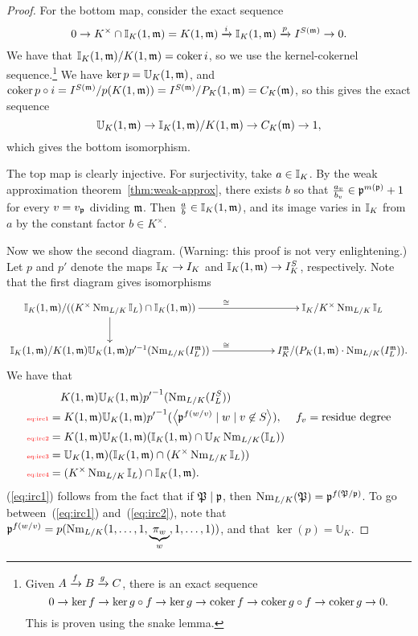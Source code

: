 \begin{proof}
For the bottom map, consider the exact sequence
\[
0\to K^{\times}\cap \mathbb{I}_K(1,{\mathfrak{m}})=K(1,\mathfrak{m})\xrightarrow{i} \mathbb{I}_K(1,{\mathfrak{m}})\xrightarrow{p} I^{S(\mathfrak{m})}\to 0.
\]
We have that $\mathbb{I}_K(1,{\mathfrak{m}})/K(1,\mathfrak{m})=\operatorname{coker} i$, so we use the kernel-cokernel sequence.\footnote{Given $A\xrightarrow{f}B\xrightarrow{g}C$, there is an exact sequence
\[
0\to \ker f\to \ker g\circ f\to \ker g\to \operatorname{coker} f\to \operatorname{coker} g\circ f\to \operatorname{coker} g\to 0.
\]
This is proven using the snake lemma.
}
We have $\ker p=\mathbb U_K(1,\mathfrak{m})$, and $\operatorname{coker} p\circ i=I^{S(\mathfrak{m})}/p(K(1,\mathfrak{m}))=I^{S(\mathfrak{m})}/P_K(1,{\mathfrak{m}})=C_K(\mathfrak{m})$, so this gives the exact sequence  
\[
\mathbb U_K(1,\mathfrak{m})\to  \mathbb{I}_K(1,{\mathfrak{m}})/K(1,{\mathfrak{m}})\to C_K(\mathfrak{m})\to 1,
\]
which gives the bottom isomorphism.

The top map is clearly injective. For surjectivity, take $a\in \mathbb{I}_K$. By the weak approximation theorem~\ref{thm:weak-approx}, there exists $b$ so that $\frac{a_v}{b_v}\in \mathfrak{p}^{m(\mathfrak{p})}+1$ for every $v=v_{\mathfrak{p}}$ dividing $\mathfrak{m}$. Then $\frac{a}{b}\in \mathbb{I}_K(1,{\mathfrak{m}})$, and its image varies in $\mathbb{I}_K$ from $a$ by the constant factor $b\in K^{\times}$.

Now we show the second diagram. (Warning: this proof is not very enlightening.) Let $p$ and $p'$ denote the maps $\mathbb{I}_K\to I_K$ and $\mathbb{I}_K(1,\mathfrak{m})\to I_K^S$, respectively. Note that the first diagram gives isomorphisms
\[
\xymatrixcolsep{5pc}
\xymatrix{
\I_K(1,{\mm})/((K^{\times}\nm_{L/K}\I_L)\cap \I_K(1,\mm)) \ar[r]^{\cong} \ar[d]& \I_K/K^{\times}\nm_{L/K}\I_L\\
\I_K(1,{\mm})/
K(1,\mm)\mathbb U_K(1,\mm)
p'^{-1}(\nm_{L/K}(I_L^{\mm}))\ar[r]^{\cong} & I_K^{\mm}/(P_{K}(1,\mm)\cdot \nm_{L/K}(I_L^{\mm})).
}
\]
We have that
\begin{align}
\noindent
&\quad
K(1,{\mm})\mathbb U_K(1,{\mm}){p'}^{-1}(\nm_{L/K}(I_L^{S}))\\
\llabel{eq:irc1}&=
K(1,{\mm})\mathbb U_K(1,{\mm}){p'}^{-1}(\an{\mfp^{f(w/v)}\mid w\mid v\nin S}),&f_v=\text{residue degree}\\
\llabel{eq:irc2}
&=
K(1,{\mm}) \mathbb U_K(1,{\mm})(\I_K(1,{\mm})\cap \mathbb U_K\nm_{L/K}(\I_L))\\
\llabel{eq:irc3}
&=
\mathbb U_K(1,\mm)( \I_K(1,{\mm})\cap(K^{\times}\nm_{L/K}\I_L))\\
\llabel{eq:irc4}
&=
(K^{\times}\nm_{L/K}\I_L)\cap \I_K(1,{\mm}).
\end{align}
(\ref{eq:irc1}) follows from the fact that if $\mathfrak{P}\mid \mathfrak{p}$, then $\operatorname{Nm}_{L/K}(\mathfrak{P})=\mathfrak{p}^{f(\mathfrak{P}/\mathfrak{p})}$. %
To go between~(\ref{eq:irc1}) and~(\ref{eq:irc2}), note that $\mathfrak{p}^{f(w/v)}=p(\operatorname{Nm}_{L/K}(1,\ldots, 1,\underbrace{\pi_w}_w,1,\ldots, 1))$, and that $\ker(p)=\mathbb U_K$. 


\end{proof}
